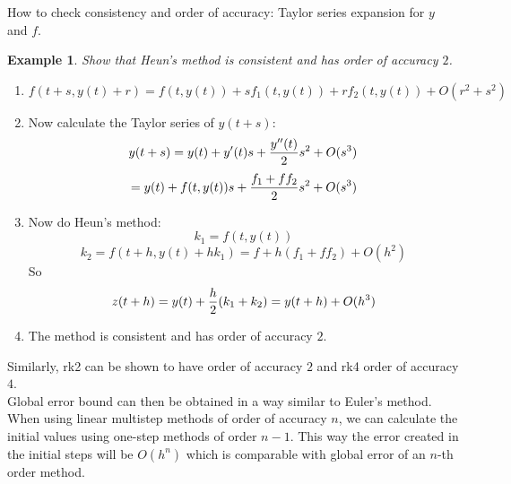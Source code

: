 \documentclass[20pt]{article} %
\theoremstyle{break}
\newtheorem{exa}[definition]{Example}
\begin{document}
How to check consistency and order of accuracy: Taylor series expansion for $y$ and $f$.
\begin{exa}Show that Heun's method is consistent and has order of accuracy $2$.\end{exa}
\begin{enumerate}
\item
  \[f(t+s, y(t)+r)=f(t, y(t))+sf_1(t, y(t))+rf_2(t, y(t))+O(r^2+s^2)\]
\item Now calculate the Taylor series of $y(t+s)$:
  \[y(t+s)=y(t)+y'(t)s+{y''(t)\over 2}s^2+O(s^3)\]
  \[=y(t)+f(t, y(t))s+{f_1+ff_2\over 2}s^2+O(s^3)\]
\item Now do Heun's method:
  \[k_1=f(t, y(t))\]
  \[k_2=f(t+h, y(t)+hk_1)=f+h(f_1+ff_2)+O(h^2)\]
  So
  \[z(t+h)=y(t)+{h\over 2}(k_1+k_2)=y(t+h)+O(h^3)\]
\item The method is consistent and has order of accuracy $2$.
\end{enumerate}

Similarly, rk2 can be shown to have order of accuracy $2$ and rk4 order of accuracy $4$.\\

Global error bound can then be obtained in a way similar to Euler's method.\\

When using linear multistep methods of order of accuracy $n$, we can calculate the initial values using one-step methods of order $n-1$. This way the error created in the initial steps will be $O(h^n)$ which is comparable with global error of an $n$-th order method.

\newpage
\end{document}
